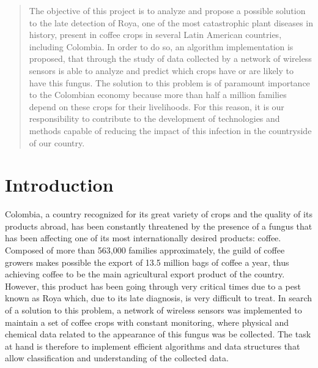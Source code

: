 \documentclass{acm_proc_article-sp}
\begin{document}
\maketitle
\begin{abstract}
The objective of this project is to analyze and propose a possible solution to the late detection of Roya, one of the most catastrophic plant diseases in history, present in coffee crops in several Latin American countries, including Colombia.  In order to do so, an algorithm implementation is proposed, that through the study of data collected by a network of wireless sensors is able to analyze and predict which crops have or are likely to have this fungus.
The solution to this problem is of paramount importance to the Colombian economy because more than half a million families depend on these crops for their livelihoods.  For this reason, it is our responsibility to contribute to the development of technologies and methods capable of reducing the impact of this infection in the countryside of our country.
\end{abstract}




\section{Introduction}
Colombia, a country recognized for its great variety of crops and the quality of its products abroad, has been constantly threatened by the presence of a fungus that has been affecting one of its most internationally desired products: coffee. Composed of more than 563,000 families approximately, the guild of coffee growers makes possible the export of 13.5 million bags of coffee a year, thus achieving coffee to be the main agricultural export product of the country. However, this product has been going through very critical times due to a pest known as Roya which, due to its late diagnosis, is very difficult to treat.
In search of a solution to this problem, a network of wireless sensors was implemented to maintain a set of coffee crops with constant monitoring, where physical and chemical data related to the appearance of this fungus was be collected. The task at hand is therefore to implement efficient algorithms and data structures that allow classification and understanding of the collected data.
\end{document}
